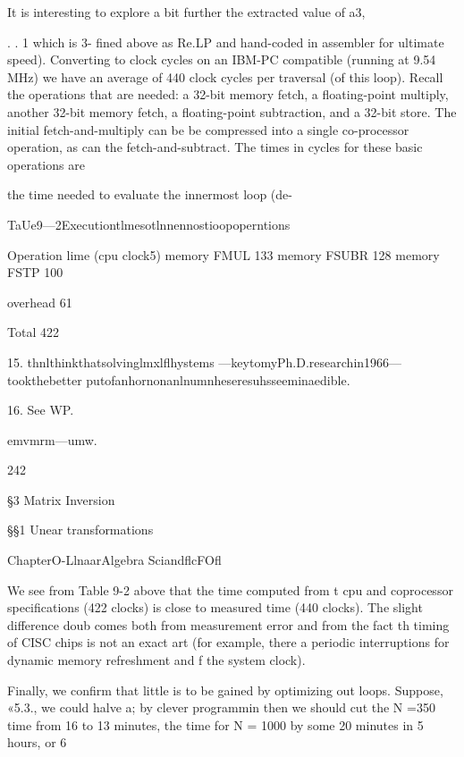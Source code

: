 {{{{{{{{{{{It is interesting to explore a bit further the extracted value of a3,

. . 1
which is 3-
ﬁned above as Re.LP and hand-coded in assembler for ultimate
speed). Converting to clock cycles on an IBM-PC compatible
(running at 9.54 MHz) we have an average of 440 clock cycles per
traversal (of this loop). Recall the operations that are needed: a
32-bit memory fetch, a ﬂoating-point multiply, another 32-bit
memory fetch, a ﬂoating-point subtraction, and a 32-bit store.
The initial fetch-and-multiply can be be compressed into a single
co-processor operation, as can the fetch-and-subtract. The times
in cycles for these basic operations are

the time needed to evaluate the innermost loop (de-

TaUe9—2Executiontlmesotlnnennostioopoperntions

 

Operation lime (cpu clock5)
memory FMUL 133
memory FSUBR 128
memory FSTP 100

overhead 61

 

Total 422

 

 

 

 

15. thnlthinkthatsolvinglmxlﬂhystems —keytomyPh.D.researchin1966— tookthebetter
putofanhornonanlnumnheseresuhsseeminaedible.

16. See WP.

emvmrm—umw.

242

\S3 Matrix Inversion

\S\S1 Unear transformations

  
 
    
   
   
  

ChapterO-LlnaarAlgebra SciandﬂcFOﬂ

We see from Table 9-2 above that the time computed from t
cpu and coprocessor speciﬁcations (422 clocks) is close to
measured time (440 clocks). The slight difference doub
comes both from measurement error and from the fact th
timing of CISC chips is not an exact art (for example, there a
periodic interruptions for dynamic memory refreshment and f
the system clock).

Finally, we conﬁrm that little is to be gained by optimizing out
loops. Suppose, «5.3., we could halve a; by clever programmin
then we should cut the N =350 time from 16 to 13 minutes,
the time for N = 1000 by some 20 minutes in 5 hours, or 6%

}}}}}}}}}}}
